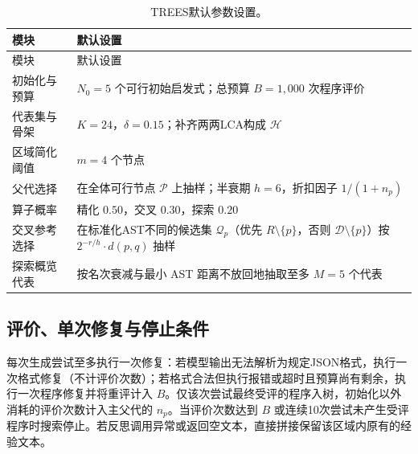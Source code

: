 \documentclass{article}
\begin{document}
\begin{longtable}[]{@{}
  >{\raggedright\arraybackslash}p{}
  >{\raggedright\arraybackslash}p{}@{}}
\caption{TREES默认参数设置。}\tabularnewline
\toprule\noalign{}
\begin{minipage}[b]{\linewidth}\raggedright
模块
\end{minipage} & \begin{minipage}[b]{\linewidth}\raggedright
默认设置
\end{minipage} \\
\midrule\noalign{}
\endfirsthead
\toprule\noalign{}
\begin{minipage}[b]{\linewidth}\raggedright
模块
\end{minipage} & \begin{minipage}[b]{\linewidth}\raggedright
默认设置
\end{minipage} \\
\midrule\noalign{}
\endhead
\bottomrule\noalign{}
\endlastfoot
初始化与预算 & \(N_0=5\) 个可行初始启发式；总预算 \(B=1{,}000\) 次程序评价 \\
代表集与骨架 & \(K=24\)，\(\delta=0.15\)；补齐两两LCA构成 \(\mathcal H\) \\
区域简化阈值 & \(m=4\) 个节点 \\
父代选择 & 在全体可行节点 \(\mathcal P\) 上抽样；半衰期 \(h=6\)，折扣因子 \(1/(1+n_p)\) \\
算子概率 & 精化 \(0.50\)，交叉 \(0.30\)，探索 \(0.20\) \\
交叉参考选择 & 在标准化AST不同的候选集 \(\mathcal Q_p\)（优先 \(R\setminus\{p\}\)，否则 \(\mathcal D\setminus\{p\}\)）按 \(2^{-r/h}\cdot d(p,q)\) 抽样 \\
探索概览代表 & 按名次衰减与最小 AST 距离不放回地抽取至多 \(M=5\) 个代表 \\
\end{longtable}

\subsection{评价、单次修复与停止条件}\label{ux8bc4ux4ef7ux5355ux6b21ux4feeux590dux4e0eux505cux6b62ux6761ux4ef6}

每次生成尝试至多执行一次修复：若模型输出无法解析为规定JSON格式，执行一次格式修复（不计评价次数）；若格式合法但执行报错或超时且预算尚有剩余，执行一次程序修复并将重评计入 \(B\)。仅该次尝试最终受评的程序入树，初始化以外消耗的评价次数计入主父代的 \(n_p\)。当评价次数达到 \(B\) 或连续10次尝试未产生受评程序时搜索停止。若反思调用异常或返回空文本，直接拼接保留该区域内原有的经验文本。
\end{document}
